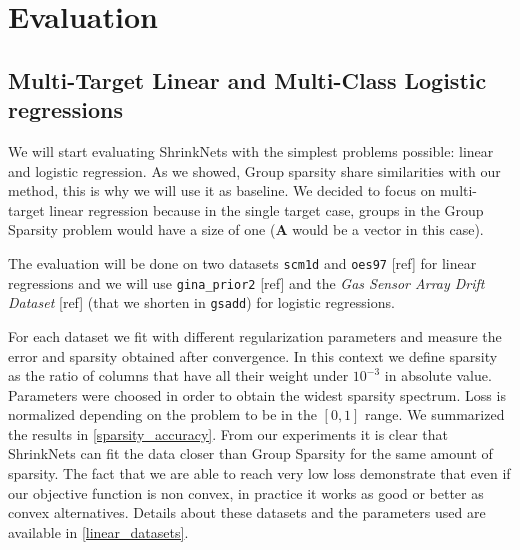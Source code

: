 \section{Evaluation}

\subsection{Multi-Target Linear and Multi-Class Logistic regressions}

We will start evaluating ShrinkNets with the simplest problems possible: linear
and logistic regression. As we showed, Group sparsity share similarities with
our method, this is why we will use it as baseline. We decided to focus on
multi-target linear regression because in the single target case, groups in the
Group Sparsity problem would have a size of one ($\bm{A}$ would be a vector in this
case).

The evaluation will be done on two datasets \texttt{scm1d} and \texttt{oes97}
[ref] for linear regressions and we will use \texttt{gina\_prior2} [ref] and
the \textit{Gas Sensor Array Drift Dataset} [ref] (that we shorten in
\texttt{gsadd}) for logistic regressions.

For each dataset we fit with different regularization parameters and measure
the error and sparsity obtained after convergence. In this context we define sparsity as the ratio of columns that have all their weight under $10^{-3}$ in absolute value. Parameters were choosed in
order to obtain the widest sparsity spectrum. Loss is normalized depending on the problem to be in the $[0, 1]$ range. We summarized the results in
\cref{sparsity_accuracy}. From our experiments it is clear that ShrinkNets can fit the data closer than Group Sparsity for the same amount of sparsity. The fact that we are able to reach very low loss demonstrate that even if our objective function is non convex, in practice it works as good or better as convex alternatives. Details about these datasets and the parameters used
are available in \cref{linear_datasets}.

